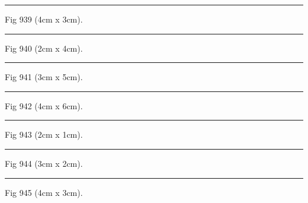 \documentclass[a4paper,11pt]{article}
\begin{document}
\begin{swarmwrap}%
  \begin{minipage}[t]{4cm}
    \centering
    \rule{\linewidth}{3cm}
    {\footnotesize Fig 939 (4cm x 3cm).}
  \end{minipage}%
\end{swarmwrap}%
\swarmwrapnext
\lipsum[39]%

\begin{swarmwrap}%
  \begin{minipage}[t]{2cm}
    \centering
    \rule{\linewidth}{4cm}
    {\footnotesize Fig 940 (2cm x 4cm).}
  \end{minipage}%
\end{swarmwrap}%
\swarmwrapnext
\lipsum[40]%

\begin{swarmwrap}%
  \begin{minipage}[t]{3cm}
    \centering
    \rule{\linewidth}{5cm}
    {\footnotesize Fig 941 (3cm x 5cm).}
  \end{minipage}%
\end{swarmwrap}%
\swarmwrapnext
\lipsum[41]%

\begin{swarmwrap}%
  \begin{minipage}[t]{4cm}
    \centering
    \rule{\linewidth}{6cm}
    {\footnotesize Fig 942 (4cm x 6cm).}
  \end{minipage}%
\end{swarmwrap}%
\swarmwrapnext
\lipsum[42]%

\begin{swarmwrap}%
  \begin{minipage}[t]{2cm}
    \centering
    \rule{\linewidth}{1cm}
    {\footnotesize Fig 943 (2cm x 1cm).}
  \end{minipage}%
\end{swarmwrap}%
\swarmwrapnext
\lipsum[43]%

\begin{swarmwrap}%
  \begin{minipage}[t]{3cm}
    \centering
    \rule{\linewidth}{2cm}
    {\footnotesize Fig 944 (3cm x 2cm).}
  \end{minipage}%
\end{swarmwrap}%
\swarmwrapnext
\lipsum[44]%

\begin{swarmwrap}%
  \begin{minipage}[t]{4cm}
    \centering
    \rule{\linewidth}{3cm}
    {\footnotesize Fig 945 (4cm x 3cm).}
  \end{minipage}%
\end{swarmwrap}%
\swarmwrapnext
\lipsum[45]%
\end{document}
